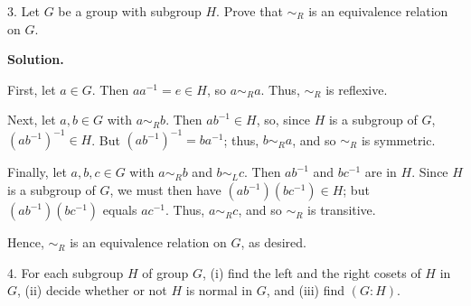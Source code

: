 \documentclass[10pt,]{book}
\theoremstyle{plain}
\theoremstyle{definition}
\theoremstyle{definition}
\theoremstyle{definition}
\theoremstyle{definition}
\numberwithin{equation}{section}
\def\siml{\sim_L}
\def\simr{\sim_R}
\begin{document}
\begin{exerciselist}
\begin{enumerate}[label=(\alph*)]
\end{enumerate}
\item[3.]\hypertarget{exercise-52}{}
        Let \(G\) be a group with subgroup \(H\). Prove that \(\simr\) is an equivalence relation on \(G\).
\par\smallskip
\par\smallskip
\noindent\textbf{Solution.}\hypertarget{solution-52}{}\quad

      First, let \(a\in G\). Then \(aa^{-1}=e\in H\),
      so \(a\simr a\). Thus, \(\simr\) is reflexive.
\par

      Next, let \(a,b\in G\) with \(a\simr b\). Then
      \(ab^{-1}\in H\), so, since \(H\) is a subgroup of \(G\),
      \((ab^{-1})^{-1}\in H\). But
      \((ab^{-1})^{-1}=ba^{-1}\); thus, \(b\simr a\), and so \(\simr\) is symmetric.
\par

      Finally, let \(a,b,c\in G\) with \(a\simr b\)
      and \(b\siml c\). Then \(ab^{-1}\) and \(bc^{-1}\) are in \(H\). Since
      \(H\) is a subgroup of \(G\), we must then have
      \((ab^{-1})(bc^{-1})\in H\); but \((ab^{-1})(bc^{-1})\) equals
      \(ac^{-1}\). Thus, \(a\simr c\), and so \(\simr\) is transitive.
\par

      Hence, \(\simr\) is an equivalence relation on \(G\), as desired.
\item[4.]\hypertarget{exercise-53}{}
        For each subgroup \(H\) of group \(G\), (i) find the left and the right cosets of \(H\) in \(G\), (ii) decide whether or not \(H\) is normal in \(G\), and (iii) find \((G:H)\).
\par


\end{exerciselist}
\end{document}
